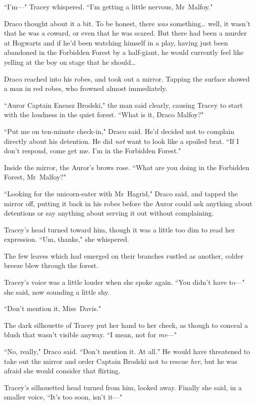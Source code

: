 ``I'm—" Tracey whispered. ``I'm getting a little nervous, Mr~Malfoy."

Draco thought about it a bit. To be honest, there \emph{was} something{\ldots} well, it wasn't that he was a coward, or even that he was scared. But there had been a murder at Hogwarts and if he'd been watching himself in a play, having just been abandoned in the Forbidden Forest by a half-giant, he would currently feel like yelling at the boy on stage that he should{\ldots}

Draco reached into his robes, and took out a mirror. Tapping the surface showed a man in red robes, who frowned almost immediately.

``Auror Captain Eneasz Brodski," the man said clearly, causing Tracey to start with the loudness in the quiet forest. ``What is it, Draco Malfoy?"

``Put me on ten-minute check-in," Draco said. He'd decided not to complain directly about his detention. He did \emph{not} want to look like a spoiled brat. ``If I don't respond, come get me. I'm in the Forbidden Forest."

Inside the mirror, the Auror's brows rose. ``What are you doing in the Forbidden Forest, Mr~Malfoy?"

``Looking for the unicorn-eater with Mr~Hagrid," Draco said, and tapped the mirror off, putting it back in his robes before the Auror could ask anything about detentions or say anything about serving it out without complaining.

Tracey's head turned toward him, though it was a little too dim to read her expression. ``Um, thanks," she whispered.

The few leaves which had emerged on their branches rustled as another, colder breeze blew through the forest.

Tracey's voice was a little louder when she spoke again. ``You didn't have to—" she said, now sounding a little shy.

``Don't mention it, Miss~Davis."

The dark silhouette of Tracey put her hand to her cheek, as though to conceal a blush that wasn't visible anyway. ``I mean, not for \emph{me}—"

``No, really," Draco said. ``Don't mention it. At all." He would have threatened to take out the mirror and order Captain Brodski not to rescue \emph{her}, but he was afraid she would consider that flirting.

Tracey's silhouetted head turned from him, looked away. Finally she said, in a smaller voice, ``It's too soon, isn't it—"

